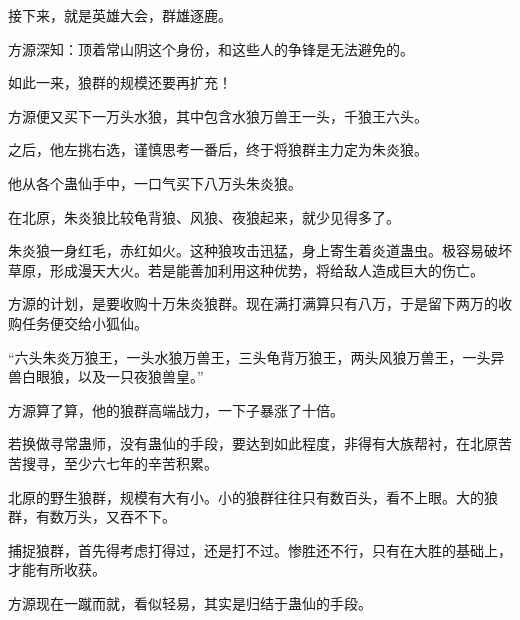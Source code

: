 \begin{this_body}
接下来，就是英雄大会，群雄逐鹿。

方源深知：顶着常山阴这个身份，和这些人的争锋是无法避免的。

如此一来，狼群的规模还要再扩充！

方源便又买下一万头水狼，其中包含水狼万兽王一头，千狼王六头。

之后，他左挑右选，谨慎思考一番后，终于将狼群主力定为朱炎狼。

他从各个蛊仙手中，一口气买下八万头朱炎狼。

在北原，朱炎狼比较龟背狼、风狼、夜狼起来，就少见得多了。

朱炎狼一身红毛，赤红如火。这种狼攻击迅猛，身上寄生着炎道蛊虫。极容易破坏草原，形成漫天大火。若是能善加利用这种优势，将给敌人造成巨大的伤亡。

方源的计划，是要收购十万朱炎狼群。现在满打满算只有八万，于是留下两万的收购任务便交给小狐仙。

“六头朱炎万狼王，一头水狼万兽王，三头龟背万狼王，两头风狼万兽王，一头异兽白眼狼，以及一只夜狼兽皇。”

方源算了算，他的狼群高端战力，一下子暴涨了十倍。

若换做寻常蛊师，没有蛊仙的手段，要达到如此程度，非得有大族帮衬，在北原苦苦搜寻，至少六七年的辛苦积累。

北原的野生狼群，规模有大有小。小的狼群往往只有数百头，看不上眼。大的狼群，有数万头，又吞不下。

捕捉狼群，首先得考虑打得过，还是打不过。惨胜还不行，只有在大胜的基础上，才能有所收获。

方源现在一蹴而就，看似轻易，其实是归结于蛊仙的手段。

\end{this_body}

